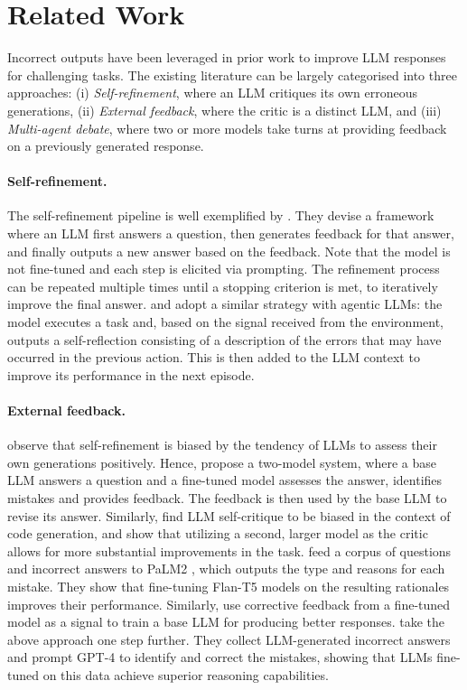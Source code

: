 \section{Related Work}
Incorrect outputs have been leveraged in prior work to improve LLM responses for challenging tasks. The existing literature can be largely categorised into three approaches: (i) \textit{Self-refinement}, where an LLM critiques its own erroneous generations, (ii) \textit{External feedback}, where the critic is a distinct LLM, and (iii) \textit{Multi-agent debate}, where two or more models take turns at providing feedback on a previously generated response.

\paragraph{Self-refinement.} The self-refinement pipeline is well exemplified by \citet{MadaanSelfRefine}. They devise a framework where an LLM first answers a question, then generates feedback for that answer, and finally outputs a new answer based on the feedback. Note that the model is not fine-tuned and each step is elicited via prompting. The refinement process can be repeated multiple times until a stopping criterion is met, to iteratively improve the final answer. \citet{KimNeurIPS23} and \citet{ShinnReflexion} adopt a similar strategy with agentic LLMs: the model executes a task and, based on the signal received from the environment, outputs a self-reflection consisting of a description of the errors that may have occurred in the previous action. This is then added to the LLM context to improve its performance in the next episode.

\paragraph{External feedback.} \citet{xu-etal-2024-pride} observe that self-refinement is biased by the tendency of LLMs to assess their own generations positively.  Hence, \citet{xu-etal-2024-llmrefine} propose a two-model system, where a base LLM answers a question and a fine-tuned model assesses the answer, identifies mistakes and provides feedback. The feedback is then used by the base LLM to revise its answer. Similarly, \citet{olausson2023self} find LLM self-critique to be biased in the context of code generation, and show that utilizing a second, larger model as the critic allows for more substantial improvements in the task. \citet{tong-etal-2024-llms} feed a corpus of questions and incorrect answers to PaLM2 \cite{anil2023palm2technicalreport}, which outputs the type and reasons for each mistake. They show that fine-tuning Flan-T5 models \cite{chung2022scalinginstructionfinetunedlanguagemodels} on the resulting rationales improves their performance. Similarly, \citet{paul-etal-2024-refiner} use corrective feedback from a fine-tuned model as a signal to train a base LLM for producing better responses. \citet{an2023lema} take the above approach one step further. They collect LLM-generated incorrect answers and prompt GPT-4 \cite{openai2024gpt4technicalreport} to identify and correct the mistakes, showing that LLMs fine-tuned on this data achieve superior reasoning capabilities.

